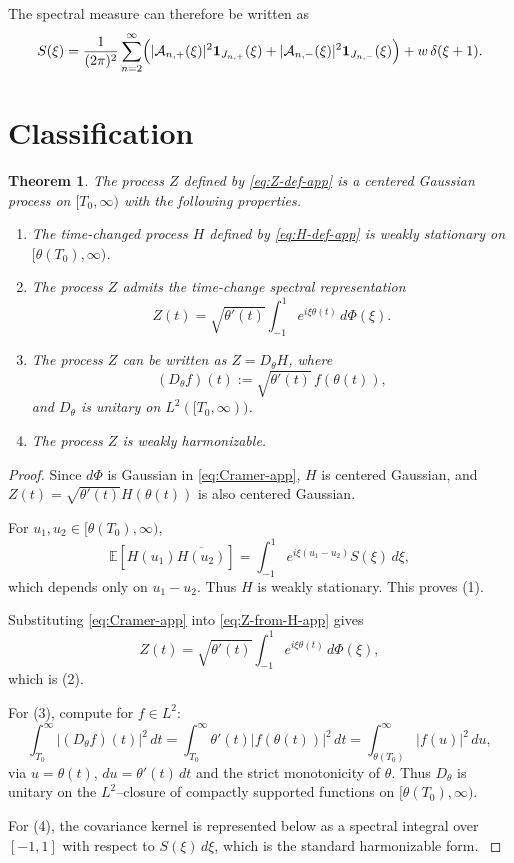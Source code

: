 \documentclass[11pt]{article}
\newtheorem{theorem}{Theorem}[section]
\begin{document}
The spectral measure can therefore be written as
\begin{equation}
S(\xi)
=
\frac{1}{(2\pi)^{2}}
\sum_{n=2}^{\infty}
\Bigl(
|\mathcal{A}_{n,+}(\xi)|^{2}\mathbf{1}_{J_{n,+}}(\xi)
+
|\mathcal{A}_{n,-}(\xi)|^{2}\mathbf{1}_{J_{n,-}}(\xi)
\Bigr)
+
w\,\delta(\xi+1).
\label{eq:S-explicit}
\end{equation}

\section{Classification}

\begin{theorem}
\label{thm:class-Z}
The process $Z$ defined by \eqref{eq:Z-def-app} is a centered Gaussian
process on $[T_{0},\infty)$ with the following properties.
\begin{enumerate}
\item
The time-changed process $H$ defined by \eqref{eq:H-def-app} is weakly
stationary on $[\theta(T_{0}),\infty)$.

\item
The process $Z$ admits the time-change spectral representation
\[
Z(t)
=
\sqrt{\theta'(t)}
\int_{-1}^{1} e^{i\xi\theta(t)}\,d\Phi(\xi).
\]

\item
The process $Z$ can be written as $Z=D_{\theta}H$, where
\[
(D_{\theta}f)(t)
:=
\sqrt{\theta'(t)}\,f(\theta(t)),
\]
and $D_{\theta}$ is unitary on $L^{2}([T_{0},\infty))$.

\item
The process $Z$ is weakly harmonizable.
\end{enumerate}
\end{theorem}

\begin{proof}
Since $d\Phi$ is Gaussian in \eqref{eq:Cramer-app}, $H$ is centered
Gaussian, and $Z(t)=\sqrt{\theta'(t)}H(\theta(t))$ is also centered
Gaussian. \cite{SpectralNonNegativity}

For $u_{1},u_{2}\in[\theta(T_{0}),\infty)$,
\[
\mathbb{E}[H(u_{1})\overline{H(u_{2})}]
=
\int_{-1}^{1} e^{i\xi(u_{1}-u_{2})} S(\xi)\,d\xi,
\]
which depends only on $u_{1}-u_{2}$. Thus $H$ is weakly stationary. This
proves (1). \cite{SpectralNonNegativity}

Substituting \eqref{eq:Cramer-app} into \eqref{eq:Z-from-H-app} gives
\[
Z(t)
=
\sqrt{\theta'(t)}
\int_{-1}^{1} e^{i\xi\theta(t)}\,d\Phi(\xi),
\]
which is (2). \cite{StationaryPhase}

For (3), compute for $f\in L^{2}$:
\[
\int_{T_{0}}^{\infty}|(D_{\theta}f)(t)|^{2}\,dt
=
\int_{T_{0}}^{\infty}\theta'(t)|f(\theta(t))|^{2}\,dt
=
\int_{\theta(T_{0})}^{\infty}|f(u)|^{2}\,du,
\]
via $u=\theta(t)$, $du=\theta'(t)\,dt$ and the strict monotonicity of
$\theta$. Thus $D_{\theta}$ is unitary on the $L^{2}$–closure of compactly
supported functions on $[\theta(T_{0}),\infty)$. \cite{StationaryPhase}

For (4), the covariance kernel is represented below as a spectral
integral over $[-1,1]$ with respect to $S(\xi)\,d\xi$, which is the
standard harmonizable form. \cite{SpectralNonNegativity}
\end{proof}
\end{document}
